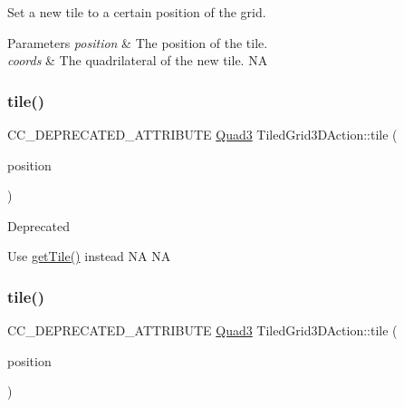Set a new tile to a certain position of the grid. 


\begin{DoxyParams}{Parameters}
{\em position} & The position of the tile. \\
\hline
{\em coords} & The quadrilateral of the new tile.  NA \\
\hline
\end{DoxyParams}
\mbox{\label{classTiledGrid3DAction_a0ba5c4fa07a2cc34fbdbf78af6e3c655}} 
\subsubsection{\texorpdfstring{tile()}{tile()}\hspace{0.1cm}{\footnotesize\ttfamily [1/2]}}
{\footnotesize\ttfamily C\+C\+\_\+\+D\+E\+P\+R\+E\+C\+A\+T\+E\+D\+\_\+\+A\+T\+T\+R\+I\+B\+U\+TE \hyperlink{structQuad3}{Quad3} Tiled\+Grid3\+D\+Action\+::tile (\begin{DoxyParamCaption}\item[{const \hyperlink{classVec2}{Vec2} \&}]{position }\end{DoxyParamCaption})\hspace{0.3cm}{\ttfamily [inline]}}

\begin{DoxyRefDesc}{Deprecated}
\item[\hyperlink{deprecated__deprecated000009}{Deprecated}]Use \hyperlink{classTiledGrid3DAction_a302f322743e028d4b4002af22490e117}{get\+Tile()} instead  NA  NA \end{DoxyRefDesc}
\mbox{\label{classTiledGrid3DAction_a0ba5c4fa07a2cc34fbdbf78af6e3c655}} 
\subsubsection{\texorpdfstring{tile()}{tile()}\hspace{0.1cm}{\footnotesize\ttfamily [2/2]}}
{\footnotesize\ttfamily C\+C\+\_\+\+D\+E\+P\+R\+E\+C\+A\+T\+E\+D\+\_\+\+A\+T\+T\+R\+I\+B\+U\+TE \hyperlink{structQuad3}{Quad3} Tiled\+Grid3\+D\+Action\+::tile (\begin{DoxyParamCaption}\item[{const \hyperlink{classVec2}{Vec2} \&}]{position }\end{DoxyParamCaption})\hspace{0.3cm}{\ttfamily [inline]}}

